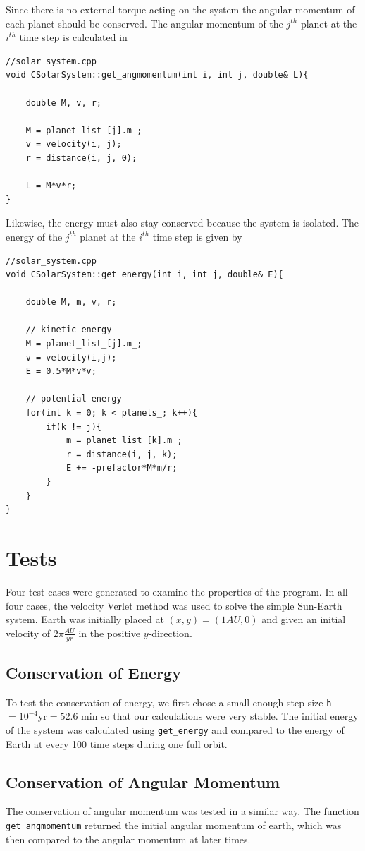 \documentclass[prb,aps,twocolumn,showpacs,10pt]{revtex4-1}
\begin{document}
Since there is no external torque acting on the system the angular momentum of each planet should be conserved. The angular momentum of the $j^{th}$ planet at the $i^{th}$ time step is calculated in
\begin{lstlisting}
//solar_system.cpp
void CSolarSystem::get_angmomentum(int i, int j, double& L){

	double M, v, r;

	M = planet_list_[j].m_;
	v = velocity(i, j);
	r = distance(i, j, 0);

	L = M*v*r;
}
\end{lstlisting}
Likewise, the energy must also stay conserved because the system is isolated. The energy of the $j^{th}$ planet at the $i^{th}$ time step is given by
\begin{lstlisting}
//solar_system.cpp
void CSolarSystem::get_energy(int i, int j, double& E){

	double M, m, v, r;

	// kinetic energy
	M = planet_list_[j].m_;
	v = velocity(i,j);
	E = 0.5*M*v*v;

	// potential energy
	for(int k = 0; k < planets_; k++){
		if(k != j){
			m = planet_list_[k].m_;
			r = distance(i, j, k);
			E += -prefactor*M*m/r;
		}
	}
}
\end{lstlisting}


\section{Tests}

Four test cases were generated to examine the properties of the program. In all four cases, the velocity Verlet method was used to solve the simple Sun-Earth system. Earth was initially placed at $(x,y)=(1 AU, 0)$ and given an initial velocity of $2\pi \frac{AU}{yr}$ in the positive $y$-direction. 
 
\subsection{Conservation of Energy}
To test the conservation of energy, we first chose a small enough step size \texttt{h\_}$=10^{-4} \text{yr} = 52.6$ min so that our calculations were very stable. The initial energy of the system was calculated using \texttt{get\_energy} and compared to the energy of Earth at every 100 time steps during one full orbit. 

\subsection{Conservation of Angular Momentum}
The conservation of angular momentum was tested in a similar way. The function \texttt{get\_angmomentum} returned the initial angular momentum of earth, which was then compared to the angular momentum at later times. 
\end{document}
